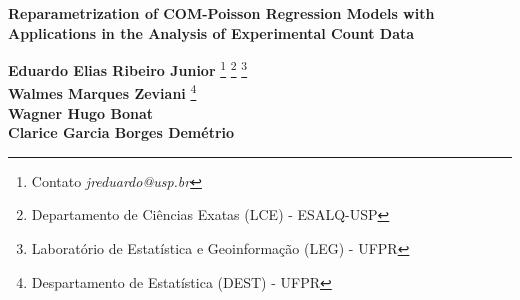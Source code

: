 \documentclass[12pt, a4paper]{article}
\begin{document}
\onehalfspacing

\begin{center}
\begin{center}
\textbf{\Large{Reparametrization of COM-Poisson Regression Models with
    Applications in the Analysis of Experimental Count Data}}\\[1em]
\end{center}
\end{center}
\vspace*{0.2cm}

\begin{flushright}
  {\bf Eduardo Elias Ribeiro Junior}
  \footnote[$\dagger$]{Contato \textit{jreduardo@usp.br}}
  \footnote[1]{Departamento de Ciências Exatas (LCE) - ESALQ-USP}
  \footnote[3]{Laboratório de Estatística e Geoinformação (LEG) -
    UFPR}\\
  {\bf Walmes Marques Zeviani} \footnote[2]{
    Despartamento de Estatística (DEST) - UFPR} \footnotemark[3]\\
  {\bf Wagner Hugo Bonat} \footnotemark[2] \footnotemark[3]\\
  {\bf Clarice Garcia Borges Demétrio} \footnotemark[1]
\end{flushright}

\vspace*{0.5cm}

\end{document}

